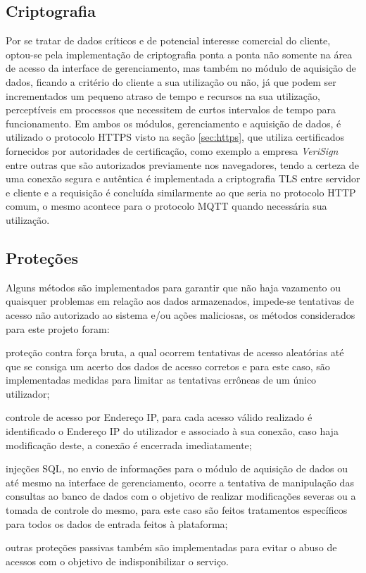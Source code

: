         \subsection{Criptografia}
        \label{sec:criptografia}
        Por se tratar de dados críticos e de potencial interesse comercial do cliente, optou-se pela implementação de criptografia ponta a ponta não somente na área de acesso da interface de gerenciamento, mas também no módulo de aquisição de dados, ficando a critério do cliente a sua utilização ou não, já que podem ser incrementados um pequeno atraso de tempo e recursos na sua utilização, perceptíveis em processos que necessitem de curtos intervalos de tempo para funcionamento.  Em ambos os módulos, gerenciamento e aquisição de dados, é utilizado o protocolo \gls{HTTPS} visto na seção \ref{sec:https}, que utiliza certificados fornecidos por autoridades de certificação, como exemplo a empresa \textit{VeriSign} entre outras que são autorizados previamente nos navegadores, tendo a certeza de uma conexão segura e autêntica é implementada a criptografia \gls{TLS} entre servidor e cliente e a requisição é concluída similarmente ao que seria no protocolo \gls{HTTP} comum, o mesmo acontece para o protocolo \gls{MQTT} quando necessária sua utilização.
        
        \subsection{Proteções}
        \label{sec:protecoes}
        
        Alguns métodos são implementados para garantir que não haja vazamento ou quaisquer problemas em relação aos dados armazenados, impede-se tentativas de acesso não autorizado ao sistema e/ou ações maliciosas, os métodos considerados para este projeto foram:
        
        \begin{alineascomponto}
            \item proteção contra força bruta, a qual ocorrem tentativas de acesso aleatórias até que se consiga um acerto dos dados de acesso corretos e para este caso, são implementadas medidas para limitar as tentativas errôneas de um único utilizador;
            \item controle de acesso por Endereço IP, para cada acesso válido realizado é identificado o Endereço IP do utilizador e associado à sua conexão, caso haja modificação deste, a conexão é encerrada imediatamente;
            \item injeções \gls{SQL}, no envio de informações para o módulo de aquisição de dados ou até mesmo na interface de gerenciamento, ocorre a tentativa de manipulação das consultas ao banco de dados com o objetivo de realizar modificações severas ou a tomada de controle do mesmo, para este caso são feitos tratamentos específicos para todos os dados de entrada feitos à plataforma;
            \item outras proteções passivas também são implementadas para evitar o abuso de acessos com o objetivo de indisponibilizar o serviço.
        \end{alineascomponto}

